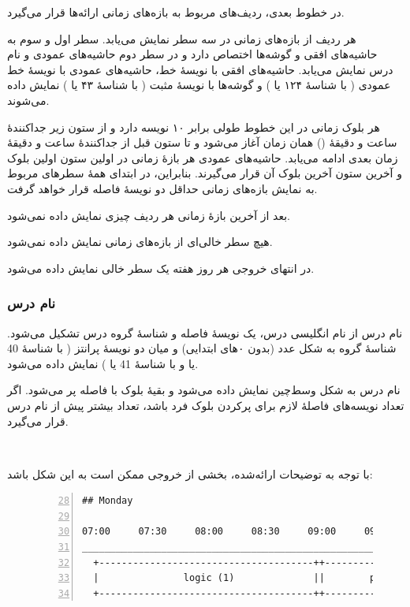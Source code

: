 \documentclass{utap}
\begin{document}
    در خطوط بعدی، ردیف‌های مربوط به بازه‌های زمانی ارائه‌ها قرار می‌گیرد.
    
    هر ردیف از بازه‌های زمانی در سه سطر نمایش می‌یابد. سطر اول و سوم به حاشیه‌های افقی و گوشه‌ها اختصاص دارد و در سطر دوم حاشیه‌های عمودی و نام درس نمایش می‌یابد. حاشیه‌های افقی با نویسهٔ خط، حاشیه‌های عمودی با نویسهٔ خط عمودی (\lr{\texttt{|}} با شناسهٔ  ۱۲۴ یا ) و گوشه‌ها با نویسهٔ مثبت (\lr{\texttt{+}} با شناسهٔ  ۴۳ یا ) نمایش داده می‌شوند.
    
    هر بلوک زمانی در این خطوط طولی برابر ۱۰ نویسه دارد و از ستون زیر جداکنندهٔ ساعت و دقیقهٔ (\lr{\texttt{:}}) همان زمان آغاز می‌شود و تا ستون قبل از جداکنندهٔ ساعت و دقیقهٔ زمان بعدی ادامه می‌یابد. حاشیه‌های عمودی هر بازهٔ زمانی در اولین ستون اولین بلوک و آخرین ستون آخرین بلوک آن قرار می‌گیرند. بنابراین، در ابتدای همهٔ سطرهای مربوط به نمایش بازه‌های زمانی حداقل دو نویسهٔ فاصله قرار خواهد گرفت.

    بعد از آخرین بازهٔ زمانی هر ردیف چیزی نمایش داده نمی‌شود.

    هیچ سطر خالی‌ای از بازه‌های زمانی نمایش داده نمی‌شود.

    در انتهای خروجی هر روز هفته یک سطر خالی نمایش داده می‌شود.

    \subsubsection{نام درس}
    
    نام درس از نام انگلیسی درس، یک نویسهٔ فاصله و شناسهٔ گروه درس تشکیل می‌شود. شناسهٔ گروه به شکل عدد (بدون ۰‌های ابتدایی) و میان دو نویسهٔ پرانتز (\lr{\texttt{(}} با شناسهٔ  40 یا  و \lr{\texttt{)}} با شناسهٔ  41 یا ) نمایش داده می‌شود.
    
    نام درس به شکل وسط‌چین نمایش داده می‌شود و بقیهٔ بلوک با فاصله پر می‌شود. اگر تعداد نویسه‌های فاصلهٔ لازم برای پرکردن بلوک فرد باشد، تعداد بیشتر پیش از نام درس قرار می‌گیرد.

    ~

    با توجه به توضیحات ارائه‌شده، بخشی از خروجی ممکن است به این شکل باشد:
    \begin{figure}[H]
    \noindent\hspace{0.1\linewidth}
    \begin{minipage}{0.8\textwidth}
    \begin{latin}
    \begin{Verbatim}[numbers=left,frame=leftline,numbersep=2pt,firstnumber=28,baselinestretch=0.75]
## Monday

07:00     07:30     08:00     08:30     09:00     09:30
_______________________________________________________
  +--------------------------------------++------------
  |               logic (1)              ||        prob
  +--------------------------------------++------------
    \end{Verbatim}
    \end{latin}
    \end{minipage}
    \end{figure}
\end{document}
